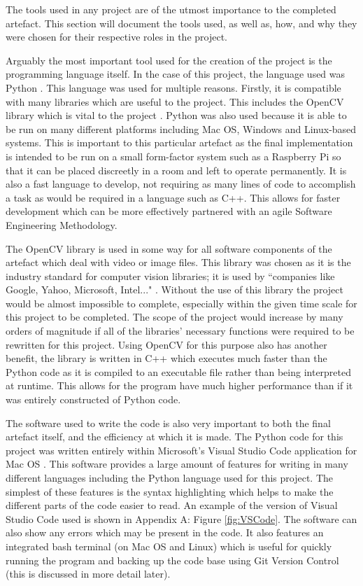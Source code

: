 \documentclass[11pt,a4paper]{report}
\begin{document}
The tools used in any project are of the utmost importance to the completed artefact. This section will document the tools used, as well as, how, and why they were chosen for their respective roles in the project.

Arguably the most important tool used for the creation of the project is the programming language itself. In the case of this project, the language used was Python \citep{Python}. This language was used for multiple reasons. Firstly, it is compatible with many libraries which are useful to the project. This includes the OpenCV library which is vital to the project \citep{OpenCV}. Python was also used because it is able to be run on many different platforms including Mac OS, Windows and Linux-based systems. This is important to this particular artefact as the final implementation is intended to be run on a small form-factor system such as a Raspberry Pi so that it can be placed discreetly in a room and left to operate permanently. It is also a fast language to develop, not requiring as many lines of code to accomplish a task as would be required in a language such as C++. This allows for faster development which can be more effectively partnered with an agile Software Engineering Methodology.    

The OpenCV library is used in some way for all software components of the artefact which deal with video or image files. This library was chosen as it is the industry standard for computer vision libraries; it is used by ``companies like Google, Yahoo, Microsoft, Intel..." \citep{OpenCV}. Without the use of this library the project would be almost impossible to complete, especially within the given time scale for this project to be completed. The scope of the project would increase by many orders of magnitude if all of the libraries' necessary functions were required to be rewritten for this project. Using OpenCV for this purpose also has another benefit, the library is written in C++ \citep{OpenCV} which executes much faster than the Python code as it is compiled to an executable file rather than being interpreted at runtime. This allows for the program have much higher performance than if it was entirely constructed of Python code.

The software used to write the code is also very important to both the final artefact itself, and the efficiency at which it is made. The Python code for this project was written entirely within Microsoft's Visual Studio Code application for Mac OS \citep{VisualStudioCode}. This software provides a large amount of features for writing in many different languages including the Python language used for this project. The simplest of these features is the syntax highlighting which helps to make the different parts of the code easier to read. An example of the version of Visual Studio Code used is shown in Appendix A: Figure \ref{fig:VSCode}. The software can also show any errors which may be present in the code. It also features an integrated bash terminal (on Mac OS and Linux) which is useful for quickly running the program and backing up the code base using Git Version Control (this is discussed in more detail later).
\end{document}
